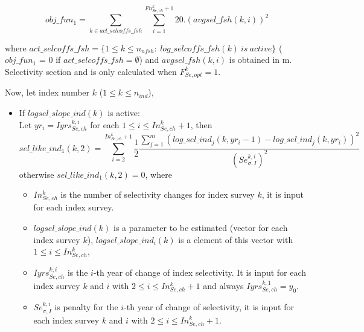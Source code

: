 \documentclass{article}
\begin{document}
\begin{equation} \label{objfun1}
    obj\_fun_1  =\sum_{k\in act\_selcoffs\_fsh} \sum_{i=1}^{Fn_{Se,ch}^k+1}20.(avgsel\_fsh(k,i))^2
\end{equation}

where $act\_selcoffs\_fsh=\{1\leq k \leq  n_{nfsh}: \ log\_selcoffs\_fsh(k)\  is \ active\}$ ($obj\_fun_1$ = 0 if $act\_selcoffs\_fsh = \emptyset$) and $avgsel\_fsh(k,i)$ is obtained in m. Selectivity section and is only calculated when $F^k_{Se,opt}=1$.



Now, let index number $k$ ($1\leq k \leq n_{ind}$),

\begin{itemize}
    \item If $logsel\_slope\_ind(k)$ is active:\\
    
    Let $yr_i = Iyrs_{Se,ch}^{k,i}$ for each $1\leq i \leq In_{Se,ch}^k+1$, then 
    \begin{equation}
        sel\_like\_ind_1(k,2) = \sum _{i=2}^{In_{Se,ch}^k+1} \dfrac{1}{2}\dfrac{\sum_{j=1}^m(log\_sel\_ind_j(k,yr_i-1)-log\_sel\_ind_j(k,yr_i))^2}{(Se_{\sigma,I}^{k,i})^2}
    \end{equation} otherwise $sel\_like\_ind_1(k,2)=0$, where 
    \begin{itemize}
         \item $In_{Se,ch}^k$ is the number of selectivity changes for index survey $k$, it is input for each index survey.
        
        \item $logsel\_slope\_ind(k)$ is a parameter to be estimated (vector for each index survey $k$), $logsel\_slope\_ind_i(k)$ is a element of this vector with $1\leq i \leq In_{Se,ch}^k$,
        
        
         \item $Iyrs_{Se,ch}^{k,i}$ is the $i$-th year of change of index selectivity. It is input for each index survey $k$ and $i$ with  $2\leq i \leq In_{Se,ch}^k+1$ and always $Iyrs_{Se,ch}^{k,1}=y_0$. 
        
        \item $Se_{\sigma,I}^{k,i}$ is penalty for the $i$-th year of change of selectivity, it is input for each index survey $k$ and $i$ with  $2\leq i \leq In_{Se,ch}^k+1$.
        

\end{itemize}
\end{itemize}
\end{document}
